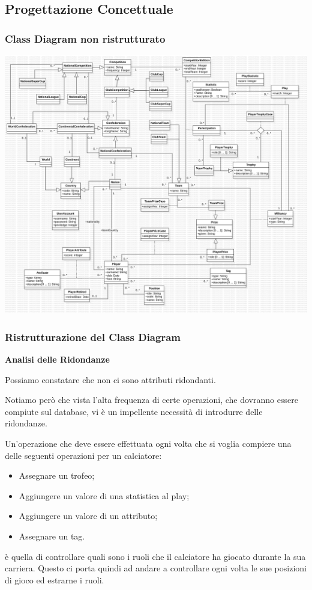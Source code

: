 \subsection{\Large Progettazione Concettuale}

\newpage

\subsubsection{\Large Class Diagram non ristrutturato}

\includegraphics[width=\textwidth]{res/class_diagram_not_ristr}
\newpage

\subsubsection{\Large Ristrutturazione del Class Diagram}

\textbf{\large Analisi delle Ridondanze}

Possiamo constatare che non ci sono attributi ridondanti.

Notiamo però che vista l'alta frequenza di certe operazioni, 
che dovranno essere compiute sul database, vi è
un impellente necessità di introdurre delle ridondanze.


Un'operazione che deve essere effettuata ogni volta che
si voglia compiere una delle seguenti operazioni
per un calciatore:
\begin{itemize}
	\item Assegnare un trofeo;
	\item Aggiungere un valore di una statistica
		al play;
	\item Aggiungere un valore di un attributo;
	\item Assegnare un tag.
\end{itemize}
è quella di controllare quali sono i ruoli
che il calciatore ha giocato durante la sua carriera.
Questo ci porta quindi ad andare a controllare ogni volta
le sue posizioni di gioco ed estrarne i ruoli.

